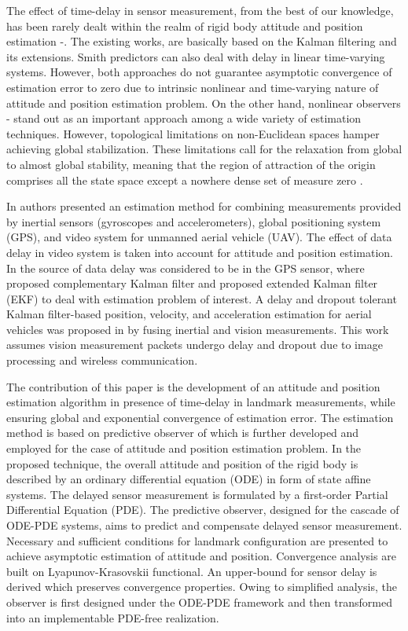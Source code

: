 \documentclass[12pt,draftcls,onecolumn]{IEEEtran}
\begin{document}
The effect of time-delay in sensor measurement, from the best of our knowledge, has been rarely dealt within the realm of rigid body attitude and position estimation \cite{c6}\nocite{c7,c8}-\cite{c9}. The existing works, are basically based on the Kalman filtering and its extensions. Smith predictors can also deal with delay in linear time-varying systems. However, both approaches do not guarantee asymptotic convergence of estimation error to zero due to intrinsic nonlinear and time-varying nature of attitude and position estimation problem. On the other hand, nonlinear observers \cite{c4,c10}\nocite{c12}-\cite{c14} stand out as an important approach among a wide variety of estimation techniques. However, topological limitations on non-Euclidean spaces hamper achieving global stabilization. These limitations call for the relaxation from global to almost global stability, meaning that the region of attraction of the origin comprises all the state space except a nowhere dense set of measure zero \cite{c4,c15}.

In \cite{c6} authors presented an estimation method for combining measurements provided by inertial sensors (gyroscopes and accelerometers), global positioning system (GPS), and video system for unmanned aerial vehicle (UAV). The effect of data delay in video system is taken into account for attitude and position estimation. In \cite{c7,c8} the source of data delay was considered to be in the GPS sensor, where \cite{c7} proposed complementary Kalman filter and \cite{c8} proposed extended Kalman filter (EKF) to deal with estimation problem of interest.  A delay and dropout tolerant Kalman filter-based position, velocity, and acceleration estimation for aerial vehicles was proposed in \cite{c9} by fusing inertial and vision measurements. This work assumes vision measurement packets undergo delay and dropout due to image processing and wireless communication.

The contribution of this paper is the development of an attitude and position estimation algorithm in presence of time-delay in landmark measurements, while ensuring global and exponential convergence of estimation error. The estimation method is based on predictive observer of \cite{c16} which is further developed and employed for the case of attitude and position estimation problem. In the proposed technique, the overall attitude and position of the rigid body is described by an ordinary differential equation (ODE) in form of state affine systems. The delayed sensor measurement is formulated by a first-order Partial Differential Equation (PDE). The predictive observer, designed for the cascade of ODE-PDE systems, aims to predict and compensate delayed sensor measurement. Necessary and sufficient conditions for landmark configuration are presented to achieve asymptotic estimation of attitude and position. Convergence analysis are built on Lyapunov-Krasovskii functional. An upper-bound for sensor delay is derived which preserves convergence properties. Owing to simplified analysis, the observer is first designed under the ODE-PDE framework and then transformed into an implementable PDE-free realization.
\end{document}

